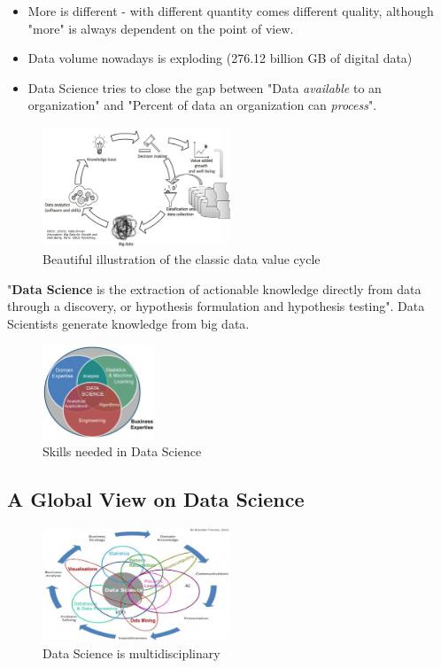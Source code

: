 \documentclass[a4paper]{article}
\begin{document}
		\begin{itemize}
			\item More is different - with different quantity comes different quality, although "more" is always dependent on the point of view.
			\item Data volume nowadays is exploding (276.12 billion GB of digital data)
			\item Data Science tries to close the gap between "Data \textit{available} to an organization" and "Percent of data an organization can \textit{process}".
		\end{itemize}
	
		\begin{figure}[htb!]
			\centering
			\includegraphics[width=0.5\textwidth]{img/sw01/data_value_cycle.png}
			\caption{Beautiful illustration of the classic data value cycle}
		\end{figure}
	\noindent
		"\textbf{Data Science} is the extraction of actionable knowledge directly from data through a discovery, or hypothesis formulation and hypothesis testing".
		Data Scientists generate knowledge from big data.
		
		\begin{figure}[htb!]
			\centering
			\includegraphics[width=0.3\textwidth]{img/sw01/ds_skills.png}
			\caption{Skills needed in Data Science}
		\end{figure}
	
		\subsection{A Global View on Data Science}
		
		\begin{figure}[htb!]
			\centering
			\includegraphics[width=0.5\textwidth]{img/sw01/multidisc.png}
			\caption{Data Science is multidisciplinary}
		\end{figure}
	
\end{document}
